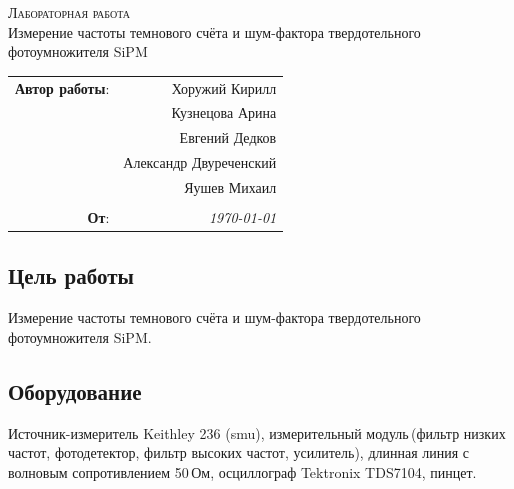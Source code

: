 
\phantom{42}
\vspace{20mm}

\begin{center}
    \LARGE \textsc{Лабораторная работа} \\
    \vspace{3 mm}
    \large Измерение частоты темнового счёта и шум-фактора твердотельного фотоумножителя SiPM
\end{center}


\phantom{42}

\begin{flushright}
    \begin{tabular}{rr}
        \textbf{Автор работы}: 
        & Хоружий Кирилл \\ 
        & Кузнецова Арина \\
        & Евгений Дедков \\
        & Александр Двуреченский \\
        & Яушев Михаил  \\ 
        & \\
        \textbf{От}: &
        \textit{\today}\\
    \end{tabular}
\end{flushright}

\thispagestyle{empty}

\vspace{10mm}


\subsection*{Цель работы}
Измерение частоты темнового счёта и шум-фактора твердотельного фотоумножителя SiPM.

\subsection*{Оборудование}
Источник-измеритель Keithley 236 (smu), измерительный модуль\,(фильтр низких частот, фотодетектор, фильтр высоких частот, усилитель), длинная линия с волновым сопротивлением 50\,Ом, осциллограф Tektronix TDS7104, пинцет.


